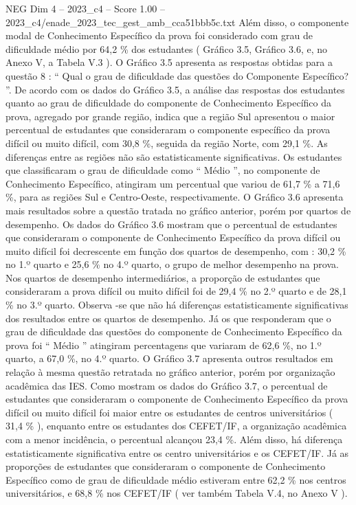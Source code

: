 \begin{textsample}{NEG Dim 4 – 2023\_c4 – Score 1.00 – 2023\_c4/enade\_2023\_tec\_gest\_amb\_cca51bbb5c.txt}
Além disso, o componente modal de Conhecimento Específico da prova foi considerado com grau de dificuldade médio por 64,2 \% dos estudantes ( Gráfico 3.5, Gráfico 3.6, e, no Anexo V, a Tabela V.3 ).
O Gráfico 3.5 apresenta as respostas obtidas para a questão 8 : “ Qual o grau de dificuldade das questões do Componente Específico? ”.
De acordo com os dados do Gráfico 3.5, a análise das respostas dos estudantes quanto ao grau de dificuldade do componente de Conhecimento Específico da prova, agregado por grande região, indica que a região Sul apresentou o maior percentual de estudantes que consideraram o componente específico da prova difícil ou muito difícil, com 30,8 \%, seguida da região Norte, com 29,1 \%.
As diferenças entre as regiões não são estatisticamente significativas.
Os estudantes que classificaram o grau de dificuldade como “ Médio ”, no componente de Conhecimento Específico, atingiram um percentual que variou de 61,7 \% a 71,6 \%, para as regiões Sul e Centro-Oeste, respectivamente.
O Gráfico 3.6 apresenta mais resultados sobre a questão tratada no gráfico anterior, porém por quartos de desempenho.
Os dados do Gráfico 3.6 mostram que o percentual de estudantes que consideraram o componente de Conhecimento Específico da prova difícil ou muito difícil foi decrescente em função dos quartos de desempenho, com : 30,2 \% no 1.º quarto e 25,6 \% no 4.º quarto, o grupo de melhor desempenho na prova.
Nos quartos de desempenho intermediários, a proporção de estudantes que consideraram a prova difícil ou muito difícil foi de 29,4 \% no 2.º quarto e de 28,1 \% no 3.º quarto.
Observa -se que não há diferenças estatisticamente significativas dos resultados entre os quartos de desempenho.
Já os que responderam que o grau de dificuldade das questões do componente de Conhecimento Específico da prova foi “ Médio ” atingiram percentagens que variaram de 62,6 \%, no 1.º quarto, a 67,0 \%, no 4.º quarto.
O Gráfico 3.7 apresenta outros resultados em relação à mesma questão retratada no gráfico anterior, porém por organização acadêmica das IES.
Como mostram os dados do Gráfico 3.7, o percentual de estudantes que consideraram o componente de Conhecimento Específico da prova difícil ou muito difícil foi maior entre os estudantes de centros universitários ( 31,4 \% ), enquanto entre os estudantes dos CEFET/IF, a organização acadêmica com a menor incidência, o percentual alcançou 23,4 \%.
Além disso, há diferença estatisticamente significativa entre os centro universitários e os CEFET/IF.
Já as proporções de estudantes que consideraram o componente de Conhecimento Específico como de grau de dificuldade médio estiveram entre 62,2 \% nos centros universitários, e 68,8 \% nos CEFET/IF ( ver também Tabela V.4, no Anexo V ).

\end{textsample}
